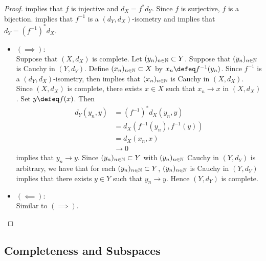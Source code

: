 \documentclass{book}
\begin{document}
\begin{proof}
	 implies that $f$ is injective and $d_X = f^*d_Y$. Since $f$ is surjective, $f$ is a bijection.  implies that $f^{-1}$ is a $(d_Y, d_X)$-isometry and  implies that $d_Y = (f^{-1})^*d_X$.
	\begin{itemize}
		\item $(\implies):$ \\
		Suppose that $(X, d_X)$ is complete. Let $(y_n)_{n \in \mathbb{N}} \subset Y$. Suppose that $(y_n)_{n \in \mathbb{N}}$ is Cauchy in $(Y, d_Y)$. Define $(x_n)_{n \in \mathbb{N}} \subset X$ by $x_n \defeq f^{-1}(y_n)$. Since $f^{-1}$ is a $(d_Y, d_X)$-isometry,  then implies that $(x_n)_{n \in \mathbb{N}}$ is Cauchy in $(X, d_X)$. Since $(X, d_X)$ is complete, there exists $x \in X$ such that $x_n \rightarrow x$ in $(X, d_X)$. Set $y \defeq f(x)$. Then 
		\begin{align*}
			d_Y(y_n, y)
			& = (f^{-1})^*d_X(y_n, y) \\
			& = d_X(f^{-1}(y_n), f^{-1}(y)) \\
			& = d_X(x_n, x) \\
			& \rightarrow 0 
		\end{align*}
		 implies that $y_n \rightarrow y$. Since $(y_n)_{n \in \mathbb{N}} \subset Y$ with $(y_n)_{n \in \mathbb{N}}$ Cauchy in $(Y, d_Y)$ is arbitrary, we have that for each $(y_n)_{n \in \mathbb{N}} \subset Y$, $(y_n)_{n \in \mathbb{N}}$ is Cauchy in $(Y, d_Y)$ implies that there exists $y \in Y$ such that $y_n \rightarrow y$. Hence $(Y, d_Y)$ is complete.
		\item $(\impliedby):$ \\
		Similar to $(\implies)$.
	\end{itemize}
\end{proof}
























\subsection{Completeness and Subspaces}
\end{document}
